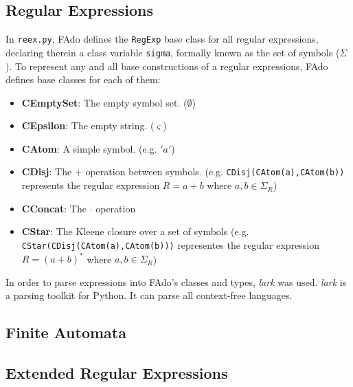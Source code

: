 \subsection{Regular Expressions}
In \texttt{reex.py}, FAdo defines the \texttt{RegExp} base class for all regular expressions, declaring therein a class variable \texttt{sigma}, formally known as the set of symbols ($\Sigma$).
To represent any and all base constructions of a regular expressions, FAdo defines base classes for each of them:
\begin{itemize}
    \item \textbf{CEmptySet}: The empty symbol set. ($\emptyset$)
    \item \textbf{CEpsilon}: The empty string. ($\varsigma$)
    \item \textbf{CAtom}: A simple symbol. (e.g. $'a'$)
    \item \textbf{CDisj}: The $+$ operation between symbols. (e.g. \texttt{CDisj(CAtom(a),CAtom(b))} represents the regular expression $R=a+b$ where $a,b \in \Sigma_R$)
    \item \textbf{CConcat}: The $\cdot$ operation 
    \item \textbf{CStar}: The Kleene closure over a set of symbols (e.g. \texttt{CStar(CDisj(CAtom(a),CAtom(b)))} representes the regular expression $R=(a+b)^*$ where $a,b \in \Sigma_R$)

\end{itemize}

In order to parse expressions into FAdo's classes and types, \emph{lark} was used. \emph{lark} is a parsing toolkit for Python. It can parse all context-free languages.



\subsection{Finite Automata}


\subsection{Extended Regular Expressions}
